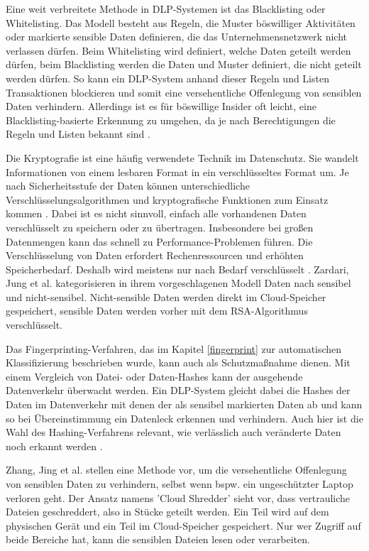 Eine weit verbreitete Methode in DLP-Systemen ist das Blacklisting oder Whitelisting. Das Modell besteht aus Regeln, die Muster böswilliger Aktivitäten oder markierte sensible Daten definieren, die das Unternehmensnetzwerk nicht verlassen dürfen. Beim Whitelisting wird definiert, welche Daten geteilt werden dürfen, beim Blacklisting werden die Daten und Muster definiert, die nicht geteilt werden dürfen. So kann ein DLP-System anhand dieser Regeln und Listen Transaktionen blockieren und somit eine versehentliche Offenlegung von sensiblen Daten verhindern. Allerdings ist es für böswillige Insider oft leicht, eine Blacklisting-basierte Erkennung zu umgehen, da je nach Berechtigungen die Regeln und Listen bekannt sind \cite{Costante.2016}.

Die Kryptografie ist eine häufig verwendete Technik im Datenschutz. Sie wandelt Informationen von einem lesbaren Format in ein verschlüsseltes Format um. Je nach Sicherheitsstufe der Daten können unterschiedliche Verschlüsselungsalgorithmen und kryptografische Funktionen zum Einsatz kommen \cite{HerreraMontano.2022}. Dabei ist es nicht sinnvoll, einfach alle vorhandenen Daten verschlüsselt zu speichern oder zu übertragen. Insbesondere bei großen Datenmengen kann das schnell zu Performance-Problemen führen. Die Verschlüsselung von Daten erfordert Rechenressourcen und erhöhten Speicherbedarf. Deshalb wird meistens nur nach Bedarf verschlüsselt \cite{Arki.2023}.
Zardari, Jung et al. \cite{Zardari.2014} kategorisieren in ihrem vorgeschlagenen Modell Daten nach sensibel und nicht-sensibel. Nicht-sensible Daten werden direkt im Cloud-Speicher gespeichert, sensible Daten werden vorher mit dem RSA-Algorithmus verschlüsselt.

Das Fingerprinting-Verfahren, das im Kapitel \ref{fingerprint} zur automatischen Klassifizierung beschrieben wurde, kann auch als Schutzmaßnahme dienen. Mit einem Vergleich von Datei- oder Daten-Hashes kann der ausgehende Datenverkehr überwacht werden. Ein DLP-System gleicht dabei die Hashes der Daten im Datenverkehr mit denen der als sensibel markierten Daten ab und kann so bei Übereinstimmung ein Datenleck erkennen und verhindern. Auch hier ist die Wahl des Hashing-Verfahrens relevant, wie verlässlich auch veränderte Daten noch erkannt werden \cite{HerreraMontano.2022}.

Zhang, Jing et al. \cite{Zhang.2011} stellen eine Methode vor, um die versehentliche Offenlegung von sensiblen Daten zu verhindern, selbst wenn bspw. ein ungeschützter Laptop verloren geht. Der Ansatz namens 'Cloud Shredder' sieht vor, dass vertrauliche Dateien geschreddert, also in Stücke geteilt werden. Ein Teil wird auf dem physischen Gerät und ein Teil im Cloud-Speicher gespeichert. Nur wer Zugriff auf beide Bereiche hat, kann die sensiblen Dateien lesen oder verarbeiten.


